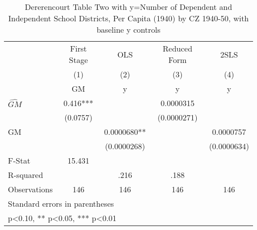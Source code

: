 \begin{table}[htbp]\centering
\def\sym#1{\ifmmode^{#1}\else\(^{#1}\)\fi}
\caption{Dererencourt Table Two with y=Number of Dependent and Independent School Districts, Per Capita (1940) by CZ 1940-50, with baseline y controls}
\begin{tabular}{l*{4}{c}}
\toprule
                    & First Stage   &         OLS   &Reduced Form   &        2SLS   \\
                    &\multicolumn{1}{c}{(1)}&\multicolumn{1}{c}{(2)}&\multicolumn{1}{c}{(3)}&\multicolumn{1}{c}{(4)}\\
                    &\multicolumn{1}{c}{GM}&\multicolumn{1}{c}{y}&\multicolumn{1}{c}{y}&\multicolumn{1}{c}{y}\\
\midrule
$\hat{GM}$          &       0.416***&               &   0.0000315   &               \\
                    &    (0.0757)   &               & (0.0000271)   &               \\
\addlinespace
GM                  &               &   0.0000680** &               &   0.0000757   \\
                    &               & (0.0000268)   &               & (0.0000634)   \\
\midrule
F-Stat              &      15.431   &               &               &               \\
R-squared           &               &        .216   &        .188   &               \\
Observations        &         146   &         146   &         146   &         146   \\
\bottomrule
\multicolumn{5}{l}{\footnotesize Standard errors in parentheses}\\
\multicolumn{5}{l}{\footnotesize * p<0.10, ** p<0.05, *** p<0.01}\\
\end{tabular}
\end{table}
